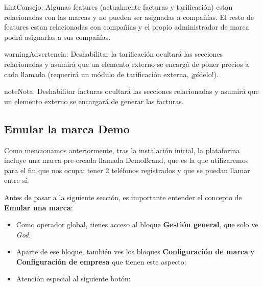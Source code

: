 \documentclass[letterpaper,10pt,spanish]{sphinxmanual}
\begin{document}
\begin{notice}{hint}{Consejo:}
Algunas features (actualmente facturas y tarificación) estan relacionadas con las marcas y no pueden ser asignadas a compañías. El resto de features estan relacionadas con compañías y el propio administrador de marca podrá asignarlas  a sus compañías.
\end{notice}

\begin{notice}{warning}{Advertencia:}
Deshabilitar la tarificación ocultará las secciones relacionadas y asumirá que un elemento externo se encargá de poner precios a cada llamada (requerirá un módulo de tarificación externa, ¡pídelo!).
\end{notice}

\begin{notice}{note}{Nota:}
Deshabilitar facturas ocultará las secciones relacionadas y asumirá que un elemento externo se encargará de generar las facturas.
\end{notice}


\subsection{Emular la marca Demo}
\label{internal_calls/god_portal:emulate-the-demo-brand}
Como mencionamos anteriormente, tras la instalación inicial, la plataforma incluye una marca pre-creada llamada DemoBrand, que es la que utilizaremos para el fin que nos ocupa: tener 2 teléfonos registrados y que se puedan llamar entre sí.

Antes de pasar a la siguiente sección, es importante entender el concepto de \textbf{Emular una marca}:
\begin{itemize}
\item {} 
Como operador global, tienes acceso al bloque \textbf{Gestión general}, que solo ve \emph{God}.

\item {} 
Aparte de ese bloque, también ves los bloques \textbf{Configuración de marca} y \textbf{Configuración de empresa} que tienen este aspecto:

\end{itemize}

\begin{itemize}
\item {} 
Atención especial al siguiente botón:

\end{itemize}
\end{document}

